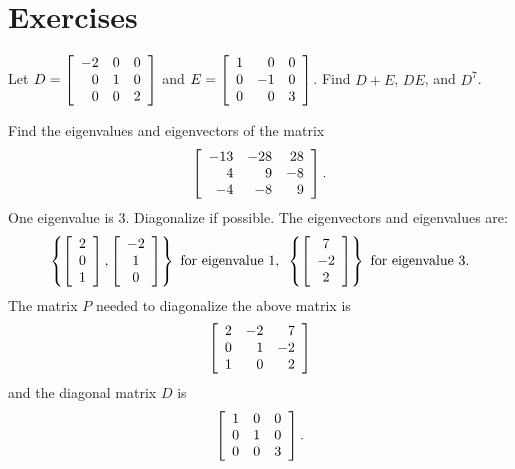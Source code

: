 \documentclass{ximera}
\author{Zack Reed}
\begin{document}
\section*{Exercises}

\begin{example}
  Let $D=\startmat{rrr}
    -2 & 0 & 0 \\
    0 & 1 & 0 \\
    0 & 0 & 2 \\
  \stopmat$ and
  $E=\startmat{rrr}
    1 & 0 & 0 \\
    0 & -1 & 0 \\
    0 & 0 & 3 \\
  \stopmat$.
  Find $D+E$, $DE$, and $D^7$.
\end{example}

\begin{example}
  Find the eigenvalues and eigenvectors of the matrix
  \begin{equation*}
    \startmat{rrr}
      -13 & -28 & 28 \\
      4 & 9 & -8 \\
      -4 & -8 & 9
    \stopmat.
  \end{equation*}
  One eigenvalue is $3$. Diagonalize if possible.
  The eigenvectors and eigenvalues are:
  \begin{equation*}
    \set{\startmat{c}
        2 \\
        0 \\
        1
      \stopmat,
      \startmat{c}
        -2 \\
        1 \\
        0
      \stopmat} ~\mbox{for eigenvalue}~ {1},
    \quad
    \set{\startmat{c}
        7 \\
        -2 \\
        2
      \stopmat} ~\mbox{for eigenvalue}~ {3}.
  \end{equation*}
  The matrix $P$ needed to diagonalize the above matrix is
  \begin{equation*}
    \startmat{rrr}
      2 & -2 & 7 \\
      0 & 1 & -2 \\
      1 & 0 & 2
    \stopmat
  \end{equation*}
  and the diagonal matrix $D$ is
  \begin{equation*}
    \startmat{rrr}
      1 & 0 & 0  \\
      0 & 1 & 0 \\
      0 & 0 & 3
    \stopmat.
  \end{equation*}
\end{example}
\end{document}
